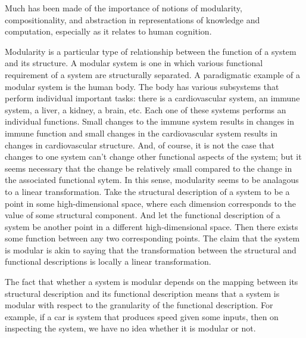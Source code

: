 \documentclass{article}
\begin{document}
Much has been made of the importance of notions of modularity,
compositionality, and abstraction in representations of knowledge and
computation, especially as it relates to human cognition. 

Modularity is a particular type of relationship between the function
of a system and its structure. A modular system is one in which
various functional requirement of a system are structurally
separated. A paradigmatic example of a modular system is the human
body. The body has various subsystems that perform individual
important tasks: there is a cardiovascular system, an immune system, a
liver, a kidney, a brain, etc. Each one of these systems performs an
individual functions. Small changes to the immune system results in
changes in immune function and small changes in the cardiovascular
system results in changes in cardiovascular structure. And, of course,
it is not the case that changes to one system can't change other
functional aspects of the system; but it seems necessary that the
change be relatively small compared to the change in the associated
functional sytem. In this sense, modularity seems to be analagous to a
linear transformation. Take the structural description of a system to
be a point in some high-dimensional space, where each dimension
corresponds to the value of some structural component. And let the
functional description of a system be another point in a different
high-dimensional space. Then there exists some function between any
two corresponding points. The claim that the system is modular is akin
to saying that the transformation between the structural and
functional descriptions is locally a linear transformation.

The fact that whether a system is modular depends on the mapping
between its structural description and its functional description
means that a system is modular with respect to the granularity of the
functional description. For example, if a car is system that produces
speed given some inputs, then on inspecting the system, we have no
idea whether it is modular or not. 
\end{document}
